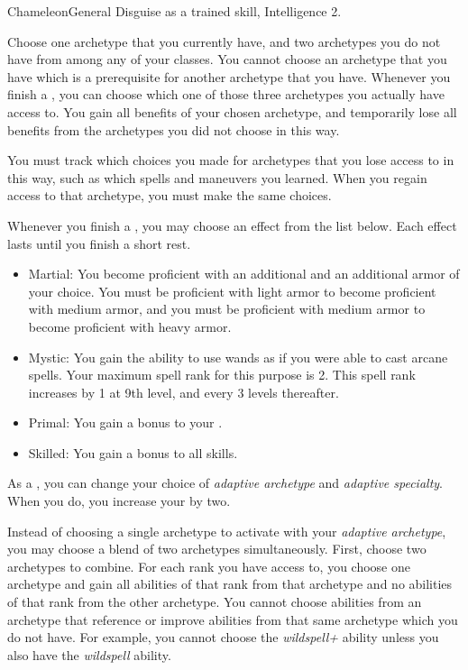     \begin{feat}{Chameleon}{General}
        \featpre Disguise as a trained skill, Intelligence 2.

         Choose one archetype that you currently have, and two archetypes you do not have from among any of your classes.
        You cannot choose an archetype that you have which is a prerequisite for another archetype that you have.
        Whenever you finish a , you can choose which one of those three archetypes you actually have access to.
        You gain all benefits of your chosen archetype, and temporarily lose all benefits from the archetypes you did not choose in this way.

        You must track which choices you made for archetypes that you lose access to in this way, such as which spells and maneuvers you learned.
        When you regain access to that archetype, you must make the same choices.

         Whenever you finish a , you may choose an effect from the list below.
        Each effect lasts until you finish a short rest.
        \begin{itemize}
            \item Martial: You become proficient with an additional  and an additional armor  of your choice.
                You must be proficient with light armor to become proficient with medium armor, and you must be proficient with medium armor to become proficient with heavy armor.
            \item Mystic: You gain the ability to use wands as if you were able to cast arcane spells.
                Your maximum spell rank for this purpose is 2.
                This spell rank increases by 1 at 9th level, and every 3 levels thereafter.
            \item Primal: You gain a  bonus to your .
            \item Skilled: You gain a  bonus to all skills.
        \end{itemize}

         As a , you can change your choice of \textit{adaptive archetype} and \textit{adaptive specialty}.
        When you do, you increase your  by two.

         Instead of choosing a single archetype to activate with your \textit{adaptive archetype}, you may choose a blend of two archetypes simultaneously.
        First, choose two archetypes to combine.
        For each rank you have access to, you choose one archetype and gain all abilities of that rank from that archetype and no abilities of that rank from the other archetype.
        You cannot choose abilities from an archetype that reference or improve abilities from that same archetype which you do not have.
        For example, you cannot choose the \textit{wildspell+} ability unless you also have the \textit{wildspell} ability.


\end{feat}
